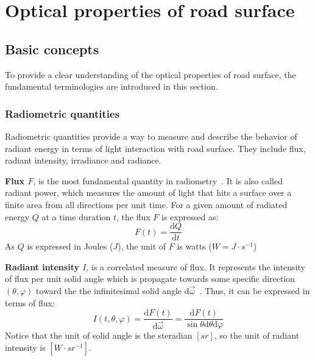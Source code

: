 \chapter{Optical properties of road surface}\label{ch:optical-properties-of-road-surface}
\label{ch: optical properties}


\section{Basic concepts}

To provide a clear understanding of the optical properties of road surface, the fundamental terminologies are introduced in this section.

\subsection{Radiometric quantities}

Radiometric quantities provide a way to measure and describe the behavior of radiant energy in terms of light interaction with road surface.
They include flux, radiant intensity, irradiance and radiance.

\textbf{Flux $F$}, is the most fundamental quantity in radiometry~\cite{2008_Jarosz}.
It is also called radiant power, which measures the amount of light that hits a surface over a finite area from all directions per unit time.
For a given amount of radiated energy $Q$ at a time duration $t$, the flux $F$ is expressed as:
\begin{equation}
    F(t) = \frac{\mathrm{d}Q}{\mathrm{d}t}
\end{equation}
As $Q$ is expressed in Joules ($J$), the unit of $F$ is watts ($W = J\cdot s^{-1}$)


\textbf{Radiant intensity $I$}, is a correlated measure of flux.
It represents the intensity of flux per unit solid angle which is propagate towards some specific direction $(\theta, \varphi)$ toward the the infinitesimal solid angle $\mathrm{d}\overrightarrow{\omega}$~\cite{2022_Hebert}.
Thus, it can be expressed in terms of flux:
\begin{equation}
    I(t, \theta, \varphi) = \frac{\mathrm{d}F(t)}{\mathrm{d}\overrightarrow{\omega}}%
    =  \frac{\mathrm{d}F(t)}{\sin \theta \mathrm{d}\theta \mathrm{d} \varphi}
\end{equation}
Notice that the unit of solid angle is the steradian $[sr]$, so the unit of radiant intensity is $[W \cdot {sr}^{-1}]$.


